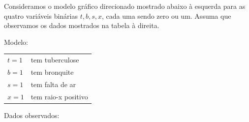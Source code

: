 


Consideramos o modelo gr\'afico direcionado mostrado abaixo \`a esquerda para
as quatro vari\'aveis bin\'arias $t,b,s,x$, cada uma sendo zero ou
um. Assuma que observamos os dados mostrados na tabela \`a
direita.\\

\begin{minipage}[t]{0.45 \textwidth}
    \begin{center}
        {\small Modelo:\\[2ex]}
    \end{center}\vspace{2ex}
    \begin{tabular}{l l}
        $t=1$& tem tuberculose\\
        $b=1$& tem bronquite \\
        $s=1$& tem falta de ar\\
        $x=1$& tem raio-x positivo
    \end{tabular}
\end{minipage}
\hspace{2ex}
\begin{minipage}[t]{0.45\textwidth}
    \begin{center}
        {\small Dados observados:\\[2ex]}
    \end{center}
\end{minipage}\\[2ex]

